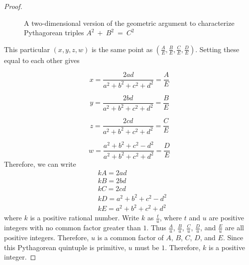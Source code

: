 \documentclass[12pt,table]{article}
\theoremstyle{definition}
\theoremstyle{remark}
\numberwithin{equation}{section}
\begin{document}
\begin{proof}
\begin{figure}
\begin{center}
\end{center}  
\caption{A two-dimensional version of the geometric argument
to characterize Pythagorean triples 
$A^2~+~B^2~=~C^2$}
\end{figure}





This particular $(x,y,z,w)$ is the same point as
$\left(\frac{A}{E},\frac{B}{E},\frac{C}{E},\frac{D}{E}\right)$. 
Setting these equal to each other gives

\[x=\frac{2ad}{a^2+b^2+c^2+d^2}=\frac{A}{E}\]

\[y=\frac{2bd}{a^2+b^2+c^2+d^2}=\frac{B}{E}\]

\[z=\frac{2cd}{a^2+b^2+c^2+d^2}=\frac{C}{E}\]

\[w=\frac{a^2+b^2+c^2-d^2}{a^2+b^2+c^2+d^2}=\frac{D}{E}\]
Therefore, we can write
\begin{align*}
     & kA = 2ad     
\\
     & kB = 2bd     
\\
     & kC = 2cd     
\\
     & kD = a^2 + b^2 + c^2 - d^2     
\\
     & kE = a^2 + b^2 + c^2 + d^2
\end{align*}     
\noindent
where $k$ is a positive rational number. 
Write $k$ as $\frac{t}{u}$, 
where $t$ and $u$ are positive integers with no common factor 
greater than $1$. 
Thus
$\frac{A}{u}$, $\frac{B}{u}$, $\frac{C}{u}$,
$\frac{D}{u}$, and $\frac{E}{u}$ are all positive integers.
 Therefore, $u$ is a common factor of $A$, $B$, $C$, $D$, and $E$. 
Since this Pythagorean quintuple is primitive, $u$ must be $1$.
Therefore, $k$ is a positive integer.
\end{proof}
\end{document}
